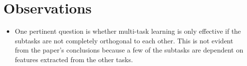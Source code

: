 \documentclass[12pt]{scrartcl}
\begin{document}
\section{Observations}
  \begin{itemize}
    \item One pertinent question is whether multi-task learning is only effective if the subtasks are not completely orthogonal to each other. This is not evident from the paper's conclusions because a few of the subtasks are dependent on features extracted from the other tasks.
  \end{itemize}



\end{document}
